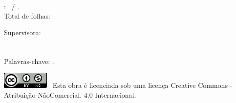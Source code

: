 \addtolength{\topmargin}{5cm}
\thispagestyle{empty}

\begin{framed}

{\raggedright \MySurnameForename} \\

\ProductTitle: \ProductSubtitle\ / \ContractYear. \\

Total de folhas: \pageref{LastPage} \\

\vspace{1cm}

Supervisora: \SupervisorName \\

\SiglaSecretaria \\

\NomeSecretaria \\

Palavras-chave: \PalavrasChave. \\

\end{framed}

\vspace{3cm}

{\raggedright \includegraphics{licenca-cc-by-nc.png} \ Esta obra é licenciada sob
uma licença Creative Commons - Atribuição-NãoComercial. 4.0 Internacional.}

\restoregeometry
\newpage
